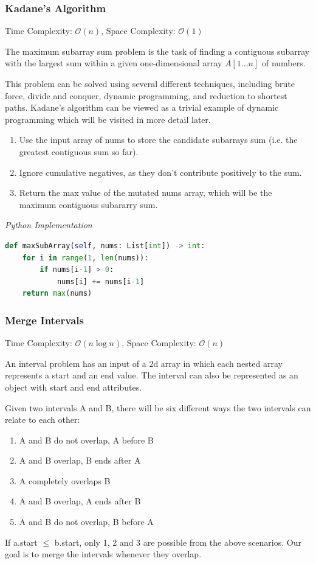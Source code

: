 \documentclass{article}
\newcommand{\bigO}{\mathcal{O}}
\begin{document}
    
    \subsubsection{Kadane's Algorithm}
    Time Complexity: $\bigO(n)$, Space Complexity: $\bigO(1)$
    
    The maximum subarray sum problem is the task of finding a contiguous subarray with the largest sum within a given one-dimensional array $A[1...n]$ of numbers.
    
    This problem can be solved using several different techniques, including brute force, divide and conquer, dynamic programming, and reduction to shortest paths. Kadane's algorithm can be viewed as a trivial example of dynamic programming which will be visited in more detail later.
    
    \begin{enumerate}
        \item Use the input array of nums to store the candidate subarrays sum (i.e. the greatest contiguous sum so far).
        \item Ignore cumulative negatives, as they don't contribute positively to the sum.
        \item Return the max value of the mutated nums array, which will be the maximum contiguous subararry sum.
    \end{enumerate} 
    
\vspace{8pt} \emph{Python Implementation}
\begin{lstlisting}[language=Python]
def maxSubArray(self, nums: List[int]) -> int:
    for i in range(1, len(nums)):
        if nums[i-1] > 0:
            nums[i] += nums[i-1]
    return max(nums)
\end{lstlisting}
    
    \subsubsection{Merge Intervals}
    Time Complexity: $\bigO(n \log n)$, Space Complexity: $\bigO(n)$
    
    An interval problem has an input of a 2d array in which each nested array represents a start and an end value. The interval can also be represented as an object with start and end attributes.
    
    Given two intervals A and B, there will be six different ways the two intervals can relate to each other:
    \begin{enumerate}
        \item A and B do not overlap, A before B
        \item A and B overlap, B ends after A
        \item A completely overlaps B
        \item A and B overlap, A ends after B
        \item  A and B do not overlap, B before A
    \end{enumerate}
    If a.start $\leq$ b.start, only 1, 2 and 3 are possible from the above scenarios.  Our goal is to merge the intervals whenever they overlap.
    
\end{document}
